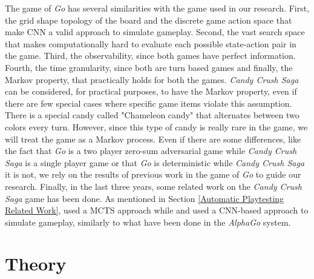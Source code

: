 The game of \textit{Go} has several similarities with the game used in our research. First, the grid shape topology of the board and the discrete game action space that make \acs{CNN} a valid approach to simulate gameplay. Second, the vast search space that makes computationally hard to evaluate each possible state-action pair in the game. Third, the observability, since both games have perfect information. Fourth, the time granularity, since both are turn based games and finally, the Markov property, that practically holds for both the games. \textit{Candy Crush Saga} can be considered, for practical purposes, to have the Markov property, even if there are few special cases where specific game items violate this assumption. There is a special candy called "Chameleon candy" that alternates between two colors every turn. However, since this type of candy is really rare in the game, we will treat the game as a Markov process. Even if there are some differences, like the fact that \textit{Go} is a two player zero-sum adversarial game while \textit{Candy Crush Saga} is a single player game or that \textit{Go} is deterministic while \textit{Candy Crush Saga} it is not, we rely on the results of previous work in the game of \textit{Go} to guide our research. Finally, in the last three years, some related work on the \textit{Candy Crush Saga} game has been done. As mentioned in Section \ref{Automatic Playtesting Related Work},  \textcite{poromaa_crushing_2017} used a \acs{MCTS} approach while \textcite{eisen_simulating_2017} and \textcite{purmonen_predicting_2017} used a \acs{CNN}-based approach to simulate gameplay, similarly to what have been done in the \textit{AlphaGo} system.

\section{Theory}

